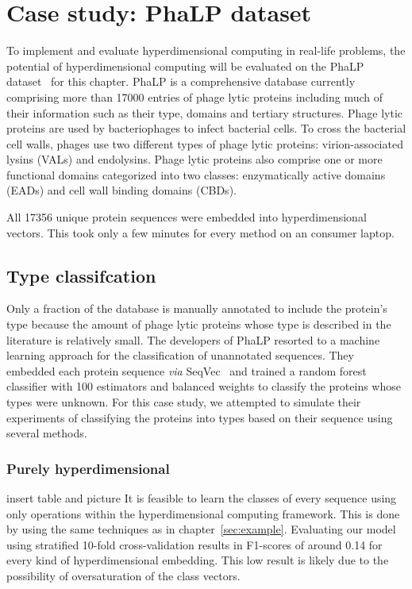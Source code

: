 \section{Case study: PhaLP dataset}
To implement and evaluate hyperdimensional computing in real-life problems, the potential of hyperdimensional computing will be evaluated on the PhaLP dataset~\cite{phalp} for this chapter. PhaLP is a comprehensive database currently comprising more than 17000 entries of phage lytic proteins including much of their information such as their type, domains and tertiary structures. Phage lytic proteins are used by bacteriophages to infect bacterial cells. To cross the bacterial cell walls, phages use two different types of phage lytic proteins: virion-associated lysins (VALs) and endolysins. Phage lytic proteins also comprise one or more functional domains categorized into two classes: enzymatically active domains (EADs) and cell wall binding domains (CBDs).

All 17356 unique protein sequences were embedded into hyperdimensional vectors. This took only a few minutes for every method on an consumer laptop.

\subsection*{Type classifcation}
Only a fraction of the database is manually annotated to include the protein's type because the amount of phage lytic proteins whose type is described in the literature is relatively small. The developers of PhaLP resorted to a machine learning approach for the classification of unannotated sequences. They embedded each protein sequence \textit{via} SeqVec~\cite{seqvec} and trained a random forest classifier with 100 estimators and balanced weights to classify the proteins whose types were unknown. For this case study, we attempted to simulate their experiments of classifying the proteins into types based on their sequence using several methods.
\subsubsection*{Purely hyperdimensional}
insert table and picture
It is feasible to learn the classes of every sequence using only operations within the hyperdimensional computing framework. This is done by using the same techniques as in chapter~\ref{sec:example}. Evaluating our model using stratified 10-fold cross-validation results in F1-scores of around 0.14 for every kind of hyperdimensional embedding. This low result is likely due to the possibility of oversaturation of the class vectors.

